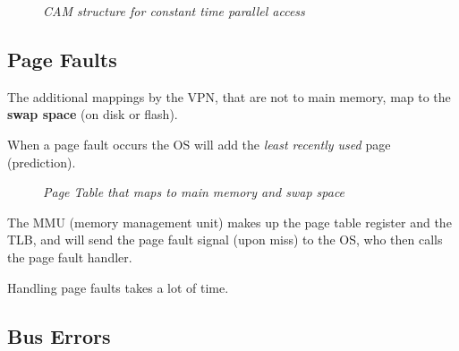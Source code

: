 \documentclass[11pt]{article}
\begin{document}
\begin{figure}[htbp]
    \centering
    \caption{\textit{CAM structure for constant time parallel access}}
\end{figure}

\subsection*{Page Faults}

The additional mappings by the VPN, that are not to main memory, map to the \textbf{swap space} (on disk or flash).

When a page fault occurs the OS will add the \textit{least recently used} page (prediction).

\pagebreak
\begin{figure}[htbp]
    \centering
    \caption{\textit{Page Table that maps to main memory and swap space}}
\end{figure}

The MMU (memory management unit) makes up the page table register and the TLB, and will send the page fault signal (upon miss) to the OS, who then calls the page fault handler.

Handling page faults takes a lot of time.

\subsection*{Bus Errors}
\end{document}
